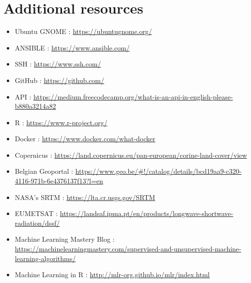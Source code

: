 \documentclass[12pt,twoside]{reedthesis}
\theoremstyle{definition}
\theoremstyle{definition}
\theoremstyle{definition}
\theoremstyle{remark}
\begin{document}
\chapter{Additional resources}\label{additional-resources}
\begin{itemize}
\item
  Ubuntu GNOME : \url{https://ubuntugnome.org/}
\item
  ANSIBLE : \url{https://www.ansible.com/}
\item
  SSH : \url{https://www.ssh.com/}
\item
  GitHub : \url{https://github.com/}
\item
  API :
  \url{https://medium.freecodecamp.org/what-is-an-api-in-english-please-b880a3214a82}
\item
  R : \url{https://www.r-project.org/}
\item
  Docker : \url{https://www.docker.com/what-docker}
\item
  Copernicus :
  \url{https://land.copernicus.eu/pan-european/corine-land-cover/view}
\item
  Belgian Geoportal :
  \url{https://www.geo.be/\#!/catalog/details/bcd19aa9-c320-4116-971b-6e4376137f13?l=en}
\item
  NASA's SRTM : \url{https://lta.cr.usgs.gov/SRTM}
\item
  EUMETSAT :
  \url{https://landsaf.ipma.pt/en/products/longwave-shortwave-radiation/dssf/}
\item
  Machine Learning Mastery Blog :
  \url{https://machinelearningmastery.com/supervised-and-unsupervised-machine-learning-algorithms/}
\item
  Machine Learning in R : \url{http://mlr-org.github.io/mlr/index.html}
\end{itemize}
\end{document}

